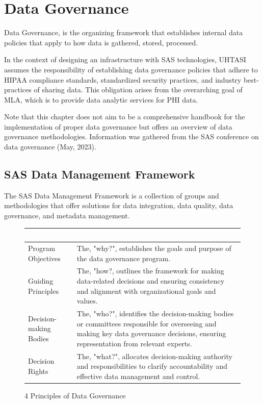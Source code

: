\section{Data Governance} \label{section: DATAG}

Data Governance, is the organizing framework that establishes internal data policies that apply to how data is gathered, stored, processed. 

In the context of designing an infrastructure with SAS technologies, UHTASI assumes the responsibility of establishing data governance policies that adhere to HIPAA compliance standards, standardized security practices, and industry best-practices of sharing data. This obligation arises from the overarching goal of MLA, which is to provide data analytic services for PHI data.

Note that this chapter does not aim to be a comprehensive handbook for the implementation of proper data governance but offers an overview of data governance methodologies. Information was gathered from the SAS conference on data governance (May, 2023).

\subsection{SAS Data Management Framework}
The SAS Data Management Framework is a collection of groups and methodologies that offer solutions for data integration, data quality, data governance, and metadata management. 

\begin{figure}[H]
\begin{center}
    \renewcommand{\arraystretch}{1.5}
    \begin{tabular}{|>{\raggedright\arraybackslash}m{3.5cm}
                    |>{\raggedright\arraybackslash}m{11.5cm}
                    |}
    \hline
    \rowcolor[HTML]{196fb4}\centering\textcolor{white}{\large Principle} 
                            & \centering\textcolor{white}{\large Description} 
                            \tabularnewline 
    \hline
    Program Objectives & The, "why?", establishes the goals and purpose of the data governance program. \\\hline
    Guiding Principles & The, "how?, outlines the framework for making data-related decisions and ensuring consistency and alignment with organizational goals and values. \\\hline
    Decision-making Bodies & The, "who?", identifies the decision-making bodies or committees responsible for overseeing and making key data governance decisions, ensuring representation from relevant experts. \\\hline
    Decision Rights & The, "what?", allocates decision-making authority and responsibilities to clarify accountability and effective data management and control. \\\hline
    \end{tabular}
\end{center}
\caption{4 Principles of Data Governance}
\label{4 DG Principles}
\end{figure}

